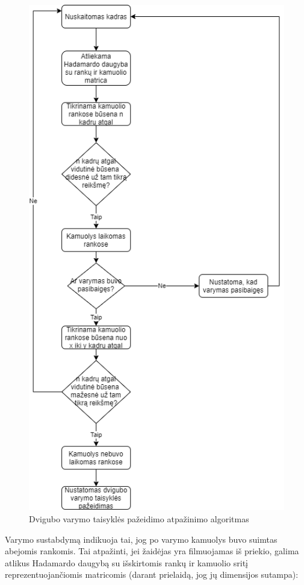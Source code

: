 \documentclass{VUMIFPSbakalaurinis}
\begin{document}
\begin{figure}[H]
	\centering
	\includegraphics[scale=0.6]{img/doubledrible_algorithm}
	\caption{Dvigubo varymo taisyklės pažeidimo atpažinimo algoritmas}
	\label{img:doubledribble_algo}
\end{figure}

Varymo sustabdymą indikuoja tai, jog po varymo kamuolys buvo suimtas abejomis rankomis. Tai atpažinti, jei žaidėjas yra filmuojamas iš priekio, galima atlikus Hadamardo daugybą su išskirtomis rankų ir kamuolio sritį reprezentuojančiomis matricomis (darant prielaidą, jog jų dimensijos sutampa):
\end{document}
